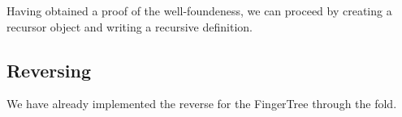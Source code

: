 \documentclass[12pt,twoside,notitlepage]{report}
\begin{document}
Having obtained a proof of the well-foundeness, we can proceed by creating a recursor object and writing a recursive definition.

\subsection{Reversing}
\label{sec:wfrec}
We have already implemented the reverse for the FingerTree through the fold. 

\begin{code} 
\\
\>[0]\<[6]%
\>[6] \AgdaSymbol{:}     \<%
\\
\>[0]\<[6]%
\>[6]  \AgdaSymbol{=}   \AgdaSymbol{\_}  \<%
\\
\>[6]\<[8]%
\>[8]  \<%
\\
\>[6]\<[8]%
\>[8] \AgdaSymbol{:}            \AgdaSymbol{)}   \<%
\\
\>[6]\<[8]%
\>[8]   \AgdaInductiveConstructor{,}      \<%
\\
\>[6]\<[8]%
\>[8]   \AgdaSymbol{)} \AgdaInductiveConstructor{,}    \AgdaSymbol{|}  \AgdaSymbol{=}  \<%
\\
\>[6]\<[8]%
\>[8]  \AgdaSymbol{\_} \AgdaInductiveConstructor{,}    \AgdaSymbol{|}    \AgdaSymbol{=}\<%
\\
\>[8]\<[12]%
\>[12] \AgdaSymbol{(} \AgdaSymbol{(}\AgdaSymbol{))} \AgdaSymbol{(} \AgdaSymbol{(} \AgdaSymbol{))}  \<%
\\
\end{code}
\end{document}
